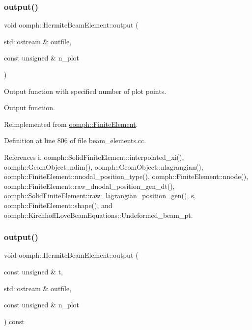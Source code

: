 \subsubsection{\texorpdfstring{output()}{output()}\hspace{0.1cm}{\footnotesize\ttfamily [2/6]}}
{\footnotesize\ttfamily void oomph\+::\+Hermite\+Beam\+Element\+::output (\begin{DoxyParamCaption}\item[{std\+::ostream \&}]{outfile,  }\item[{const unsigned \&}]{n\+\_\+plot }\end{DoxyParamCaption})\hspace{0.3cm}{\ttfamily [virtual]}}



Output function with specified number of plot points. 

Output function. 

Reimplemented from \hyperlink{classoomph_1_1FiniteElement_afa9d9b2670f999b43e6679c9dd28c457}{oomph\+::\+Finite\+Element}.



Definition at line 806 of file beam\+\_\+elements.\+cc.



References i, oomph\+::\+Solid\+Finite\+Element\+::interpolated\+\_\+xi(), oomph\+::\+Geom\+Object\+::ndim(), oomph\+::\+Geom\+Object\+::nlagrangian(), oomph\+::\+Finite\+Element\+::nnodal\+\_\+position\+\_\+type(), oomph\+::\+Finite\+Element\+::nnode(), oomph\+::\+Finite\+Element\+::raw\+\_\+dnodal\+\_\+position\+\_\+gen\+\_\+dt(), oomph\+::\+Solid\+Finite\+Element\+::raw\+\_\+lagrangian\+\_\+position\+\_\+gen(), s, oomph\+::\+Finite\+Element\+::shape(), and oomph\+::\+Kirchhoff\+Love\+Beam\+Equations\+::\+Undeformed\+\_\+beam\+\_\+pt.

\mbox{\label{classoomph_1_1HermiteBeamElement_aa86c489ad41bc0fb5d9ac3268883c826}} 
\subsubsection{\texorpdfstring{output()}{output()}\hspace{0.1cm}{\footnotesize\ttfamily [3/6]}}
{\footnotesize\ttfamily void oomph\+::\+Hermite\+Beam\+Element\+::output (\begin{DoxyParamCaption}\item[{const unsigned \&}]{t,  }\item[{std\+::ostream \&}]{outfile,  }\item[{const unsigned \&}]{n\+\_\+plot }\end{DoxyParamCaption}) const\hspace{0.3cm}{\ttfamily [virtual]}}



